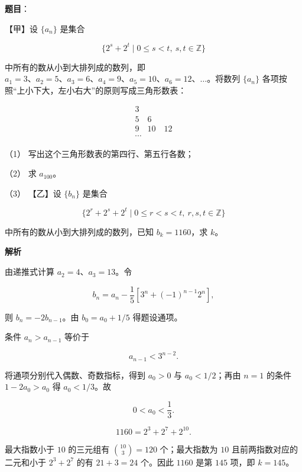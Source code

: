 \begin{answer}

\textbf{题目}：

【甲】设 $\{a_n\}$ 是集合

\nopagebreak[4]
\[
\{2^s+2^t\mid 0\leqslant s<t,\ s,t\in\mathbb Z\}
\]

中所有的数从小到大排列成的数列，即 $a_1=3\text{、}a_2=5\text{、}a_3=6\text{、}a_4=9\text{、}a_5=10\text{、}a_6=12\text{、}\ldots$。将数列 $\{a_n\}$ 各项按照“上小下大，左小右大”的原则写成三角形数表：

\nopagebreak[4]
\[
\begin{array}{c}
3\\
5\quad6\\
9\quad10\quad12\\
\cdots
\end{array}
\]

（1） 写出这个三角形数表的第四行、第五行各数；

（2） 求 $a_{100}$。

（3） 【乙】设 $\{b_n\}$ 是集合

\nopagebreak[4]
\[
\{2^r+2^s+2^t\mid 0\leqslant r<s<t,\ r,s,t\in\mathbb Z\}
\]

中所有的数从小到大排列成的数列，已知 $b_k=1160$，求 $k$。

\textbf{解析}


由递推式计算 $a_2=4\text{、}a_3=13$。令

\nopagebreak[4]
\[
b_n=a_n-\frac15\left[3^n+(-1)^{n-1}2^n\right],
\]

则 $b_n=-2b_{n-1}$。由 $b_0=a_0+1/5$ 得题设通项。


条件 $a_n>a_{n-1}$ 等价于

\nopagebreak[4]
\[
a_{n-1}<3^{n-2}.
\]

将通项分别代入偶数、奇数指标，得到 $a_0>0$ 与 $a_0<1/2$；再由 $n=1$ 的条件 $1-2a_0>a_0$ 得 $a_0<1/3$。故

\nopagebreak[4]
\[
0<a_0<\frac13.
\]


\nopagebreak[4]
\[
1160=2^3+2^7+2^{10}.
\]

最大指数小于 $10$ 的三元组有 $\binom{10}{3}=120$ 个；最大指数为 $10$ 且前两指数对应的二元和小于 $2^3+2^7$ 的有 $21+3=24$ 个。因此 $1160$ 是第 $145$ 项，即 $k=145$。




\end{answer}